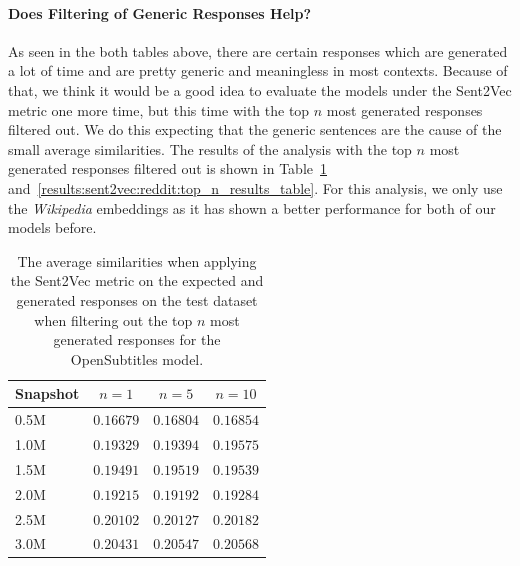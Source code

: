 \paragraph{Does Filtering of Generic Responses Help?} As seen in the both tables above, there are certain responses which are generated a lot of time and are pretty generic and meaningless in most contexts. Because of that, we think it would be a good idea to evaluate the models under the Sent2Vec metric one more time, but this time with the top $n$ most generated responses filtered out. We do this expecting that the generic sentences are the cause of the small average similarities. The results of the analysis with the top $n$ most generated responses filtered out is shown in Table~\ref{results:sent2vec:opensubtitles:top_n_results_table} and~\ref{results:sent2vec:reddit:top_n_results_table}. For this analysis, we only use the \emph{Wikipedia} embeddings as it has shown a better performance for both of our models before.
\\
\begin{table}[H]
	\centering
	\begin{adjustbox}{max width=\textwidth}
		\begin{tabular}{lccc}
			\toprule
			Snapshot & $n = 1$ & $n = 5$ & $n = 10$\\
			\midrule
			0.5M & $0.16679$ & $0.16804$ & $0.16854$\\
			1.0M & $0.19329$ & $0.19394$ & $0.19575$\\
			1.5M & $0.19491$ & $0.19519$ & $0.19539$\\
			2.0M & $0.19215$ & $0.19192$ & $0.19284$\\
			2.5M & $0.20102$ & $0.20127$ & $0.20182$\\
			3.0M & $0.20431$ & $0.20547$ & $0.20568$\\
			\bottomrule
		\end{tabular}
	\end{adjustbox}
	\caption{The average similarities when applying the Sent2Vec metric on the expected and generated responses on the test dataset when filtering out the top $n$ most generated responses for the OpenSubtitles model.}
	\label{results:sent2vec:opensubtitles:top_n_results_table}
\end{table}

